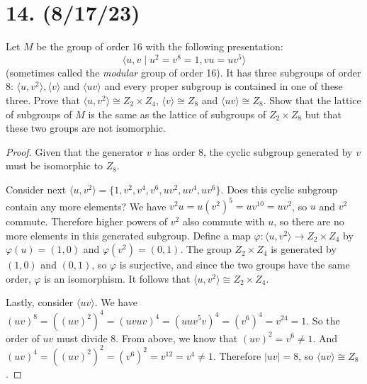 \documentclass{article}
\begin{document}
\section*{14. (8/17/23)}

Let $M$ be the group of order 16 with the following presentation:
\begin{equation*}
    \langle u, v \mid u^2 = v^8 = 1, vu = uv^5 \rangle
\end{equation*}
(sometimes called the \emph{modular} group of order 16). It has three subgroups of order 8: $\langle u, v^2 \rangle, \langle v \rangle$ and $\langle uv \rangle$ and every proper subgroup is contained in one of these three. Prove that $\langle u, v^2 \rangle \cong Z_2 \times Z_4$, $\langle v \rangle \cong Z_8$ and $\langle uv \rangle \cong Z_8$. Show that the lattice of subgroups of $M$ is the same as the lattice of subgroups of $Z_2 \times Z_8$ but that these two groups are not isomorphic.

\begin{proof}
    Given that the generator $v$ has order 8, the cyclic subgroup generated by $v$ must be isomorphic to $Z_8$.

    Consider next $\langle u, v^2 \rangle = \{ 1, v^2, v^4, v^6, uv^2, uv^4, uv^6 \}$. Does this cyclic subgroup contain any more elements? We have $v^2 u = u(v^2)^5 = uv^{10} = uv^2$, so $u$ and $v^2$ commute. Therefore higher powers of $v^2$ also commute with $u$, so there are no more elements in this generated subgroup. Define a map $\varphi: \langle u, v^2 \rangle \rightarrow Z_2 \times Z_4$ by $\varphi(u) = (1, 0)$ and $\varphi(v^2) = (0, 1)$. The group $Z_2 \times Z_4$ is generated by $(1, 0)$ and $(0, 1)$, so $\varphi$ is surjective, and since the two groups have the same order, $\varphi$ is an isomorphism. It follows that $\langle u, v^2 \rangle \cong Z_2 \times Z_4$.

    Lastly, consider $\langle uv \rangle$. We have $(uv)^8 = ((uv)^2)^4 = (uvuv)^4 = (uuv^5 v)^4 = (v^6)^4 = v^{24} = 1$. So the order of $uv$ must divide 8. From above, we know that $(uv)^2 = v^6 \neq 1$. And $(uv)^4 = ((uv)^2)^2 = (v^6)^2 = v^{12} = v^4 \neq 1$. Therefore $|uv| = 8$, so $\langle uv \rangle \cong Z_8$.
\end{proof}
\end{document}
